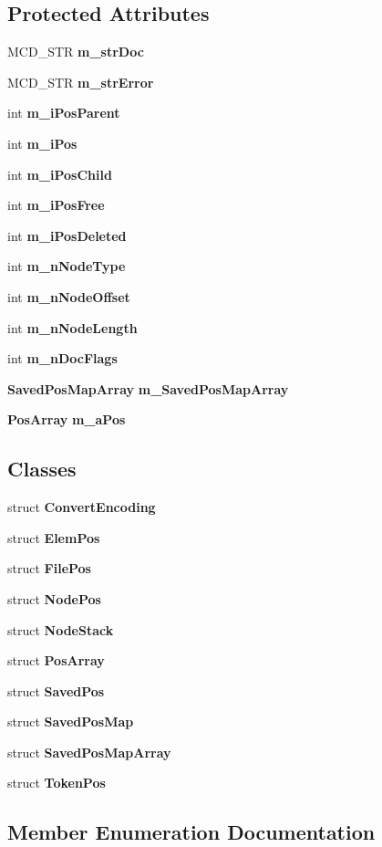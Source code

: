 \subsection*{Protected Attributes}
\begin{CompactItemize}
\item 
MCD\_\-STR {\bf m\_\-strDoc}
\item 
MCD\_\-STR {\bf m\_\-strError}
\item 
int {\bf m\_\-iPosParent}
\item 
int {\bf m\_\-iPos}
\item 
int {\bf m\_\-iPosChild}
\item 
int {\bf m\_\-iPosFree}
\item 
int {\bf m\_\-iPosDeleted}
\item 
int {\bf m\_\-nNodeType}
\item 
int {\bf m\_\-nNodeOffset}
\item 
int {\bf m\_\-nNodeLength}
\item 
int {\bf m\_\-nDocFlags}
\item 
{\bf SavedPosMapArray} {\bf m\_\-SavedPosMapArray}
\item 
{\bf PosArray} {\bf m\_\-aPos}
\end{CompactItemize}
\subsection*{Classes}
\begin{CompactItemize}
\item 
struct {\bf ConvertEncoding}
\item 
struct {\bf ElemPos}
\item 
struct {\bf FilePos}
\item 
struct {\bf NodePos}
\item 
struct {\bf NodeStack}
\item 
struct {\bf PosArray}
\item 
struct {\bf SavedPos}
\item 
struct {\bf SavedPosMap}
\item 
struct {\bf SavedPosMapArray}
\item 
struct {\bf TokenPos}
\end{CompactItemize}


\subsection{Member Enumeration Documentation}
